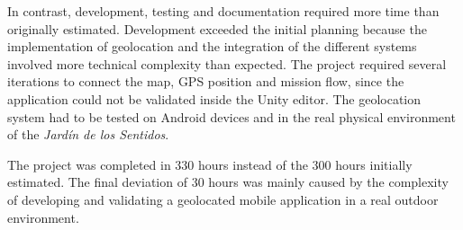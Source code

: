 In contrast, development, testing and documentation required more time than originally estimated. Development exceeded the initial planning because the implementation of geolocation and the integration of the different systems involved more technical complexity than expected. The project required several iterations to connect the map, GPS position and mission flow, since the application could not be validated inside the Unity editor. The geolocation system had to be tested on Android devices and in the real physical environment of the \textit{Jardín de los Sentidos}.

The project was completed in 330 hours instead of the 300 hours initially estimated. The final deviation of 30 hours was mainly caused by the complexity of developing and validating a geolocated mobile application in a real outdoor environment.